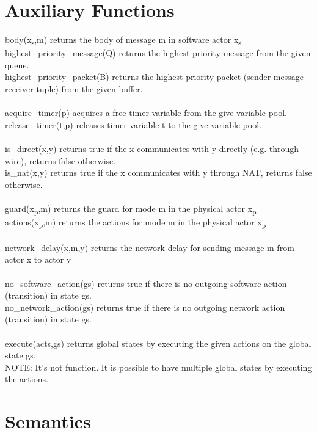 \documentclass[]{article}
\title{}
\author{}
\begin{document}
\section{Auxiliary Functions}
body(x\textsubscript{s},m) returns the body of message m in software actor x\textsubscript{s} \\
highest\_priority\_message(Q) returns the highest priority message from the given queue. \\
highest\_priority\_packet(B) returns the highest priority packet (sender-message-receiver tuple) from the given buffer. \\ 
\\
acquire\_timer(p) acquires a free timer variable from the give variable pool. \\
release\_timer(t,p) releases timer variable t to the give variable pool. \\
\\
is\_direct(x,y) returns true if the x communicates with y directly (e.g. through wire), returns false otherwise. \\
is\_nat(x,y) returns true if the x communicates with y through NAT, returns false otherwise. \\
\\
guard(x\textsubscript{p},m) returns the guard for mode m in the physical actor x\textsubscript{p} \\
actions(x\textsubscript{p},m) returns the actions for mode m in the physical actor x\textsubscript{p} \\
\\
network\_delay(x,m,y) returns the network delay for sending message m from actor x to actor y \\
\\
no\_software\_action(gs) returns true if there is no outgoing software action (transition) in state gs. \\
no\_network\_action(gs) returns true if there is no outgoing network action (transition) in state gs. \\
\\
execute(acts,gs) returns global states by executing the given actions on the global state gs. \\
NOTE: It's not function. It is possible to have multiple global states by executing the actions. \\

\section{Semantics}
\end{document}
